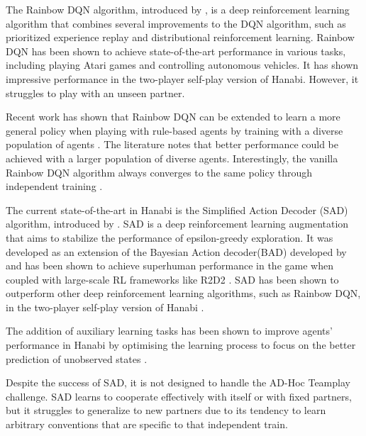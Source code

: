 The Rainbow DQN algorithm, introduced by \textcite{hesselRainbowCombiningImprovements2017}, is a deep reinforcement learning algorithm that combines several improvements to the DQN algorithm, such as prioritized experience replay and distributional reinforcement learning. Rainbow DQN has been shown to achieve state-of-the-art performance in various tasks, including playing Atari games and controlling autonomous vehicles. It has shown impressive performance in the two-player self-play version of Hanabi. However, it struggles to play with an unseen partner\cite{canaanEvaluatingRainbowDQN2020}.

Recent work has shown that Rainbow DQN can be extended to learn a more general policy when playing with rule-based agents by training with a diverse population of agents \cite{canaanDiverseAgentsAdHoc2019}. The literature notes that better performance could be achieved with a larger population of diverse agents. Interestingly, the vanilla Rainbow DQN algorithm always converges to the same policy through independent training \cite{canaanDiverseAgentsAdHoc2019,bardHanabiChallengeNew2020a}.

The current state-of-the-art in Hanabi is the Simplified Action Decoder (SAD) algorithm, introduced by \textcite{huSimplifiedActionDecoder2021}. SAD is a deep reinforcement learning augmentation that aims to stabilize the performance of epsilon-greedy exploration. It was developed as an extension of the Bayesian Action decoder(BAD) developed by \textcite
{foersterBayesianActionDecoder2019} and has been shown to achieve superhuman performance in the game when coupled with large-scale RL frameworks like R2D2 \cite{kapturowskiRecurrentExperienceReplay2018}. SAD has been shown to outperform other deep reinforcement learning algorithms, such as Rainbow DQN, in the two-player self-play version of Hanabi \cite{huSimplifiedActionDecoder2021}.

The addition of auxiliary learning tasks has been shown to improve agents' performance in Hanabi by optimising the learning process to focus on the better prediction of unobserved states \cite{huSimplifiedActionDecoder2021}.

Despite the success of SAD, it is not designed to handle the AD-Hoc Teamplay challenge. SAD learns to cooperate effectively with itself or with fixed partners, but it struggles to generalize to new partners \cite{huOtherPlayZeroShotCoordination} due to its tendency to learn arbitrary conventions that are specific to that independent train.

